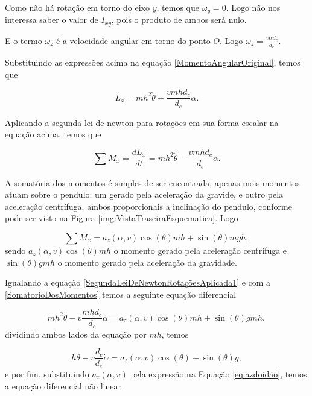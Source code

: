         Como não há rotação em torno do eixo $y$, temos que $\omega_y=0$. Logo não nos interessa saber o valor de $I_{xy}$, pois o produto de ambos será nulo.
        
        E o termo $\omega_z$ é a velocidade angular em torno do ponto $O$. Logo $\omega_z = \frac{v \alpha d_c}{d_e}$.
        
        Substituindo as expressões acima na equação \ref{MomentoAngularOriginal}, temos que
        
        \begin{equation}
            L_x = mh^2 \dot \theta - \frac{vmhd_c}{d_e}\alpha.
        \end{equation}
        
        Aplicando a segunda lei de newton para rotações em sua forma escalar na equação acima, temos que
        
        \begin{equation}
            \sum M_x = \frac{d L_x}{dt} = mh^2 \ddot \theta - \frac{vmhd_c}{d_e}\dot \alpha.
            \label{SegundaLeiDeNewtonRotaçõesAplicada1}
        \end{equation}
        
        A somatória dos momentos é simples de ser encontrada, apenas mois momentos atuam sobre o pendulo: um gerado pela aceleração da gravide, e outro pela aceleração centrífuga, ambos proporcionais a inclinação do pendulo, conforme pode ser visto na Figura \ref{img:VistaTraseiraEsquematica}. Logo
    
        \begin{equation}
            \sum M_x  = a_z(\alpha,v) \cos(\theta)mh + \sin(\theta)mgh,
            \label{SomatorioDosMomentos}
        \end{equation}
        sendo $a_z(\alpha,v) \cos(\theta)mh$ o momento gerado pela aceleração centrífuga e $\sin(\theta)gmh$ o momento gerado pela aceleração da gravidade.
        
        Igualando a equação \ref{SegundaLeiDeNewtonRotaçõesAplicada1} e com a \ref{SomatorioDosMomentos} temos a seguinte equação diferencial
        
        \begin{equation}
            mh^2 \ddot \theta - v\frac{mhd_c}{d_e}\dot \alpha = a_z(\alpha,v) \cos(\theta)mh + \sin(\theta)gmh,
        \end{equation}
        dividindo ambos lados da equação por $mh$, temos

        \begin{equation}
            h \ddot \theta - v\frac{d_c}{d_e}\dot \alpha = a_z(\alpha,v) \cos(\theta) + \sin(\theta)g,
        \end{equation}
        e por fim, substituindo $a_z(\alpha,v)$ pela expressão na Equação \eqref{eq:azdoidão}, temos a equação diferencial não linear
        

